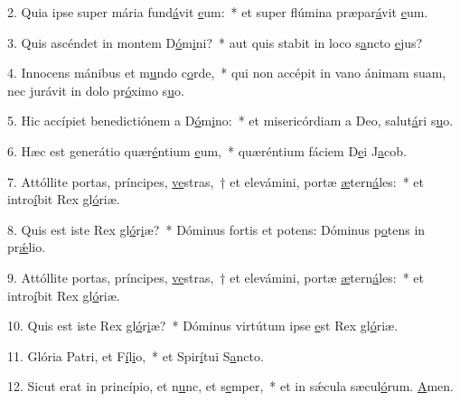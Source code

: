 2. Quia ipse super mária fund\uline{á}vit \uline{e}um:~* et super flúmina præpar\uline{á}vit \uline{e}um.\par 
3. Quis ascéndet in montem D\uline{ó}m\uline{i}ni?~* aut quis stabit in loco s\uline{a}ncto \uline{e}jus?\par 
4. Innocens mánibus et m\uline{u}ndo c\uline{o}rde,~* qui non accépit in vano ánimam suam, nec jurávit in dolo pr\uline{ó}ximo s\uline{u}o.\par 
5. Hic accípiet benedictiónem a D\uline{ó}m\uline{i}no:~* et misericórdiam a Deo, salut\uline{á}ri s\uline{u}o.\par 
6. Hæc est generátio quær\uline{é}ntium \uline{e}um,~* quæréntium fáciem D\uline{e}i J\uline{a}cob.\par 
7. Attóllite portas, príncipes, \uline{ve}stras,~† et elevámini, portæ \uline{æ}tern\uline{á}les:~* et intro\uline{í}bit Rex gl\uline{ó}riæ.\par 
8. Quis est iste Rex gl\uline{ó}r\uline{i}æ?~* Dóminus fortis et potens: Dóminus p\uline{o}tens in pr\uline{ǽ}lio.\par 
9. Attóllite portas, príncipes, \uline{ve}stras,~† et elevámini, portæ \uline{æ}tern\uline{á}les:~* et intro\uline{í}bit Rex gl\uline{ó}riæ.\par 
10. Quis est iste Rex gl\uline{ó}r\uline{i}æ?~* Dóminus virtútum ipse \uline{e}st Rex gl\uline{ó}riæ.\par 
11. Glória Patri, et F\uline{í}l\uline{i}o,~* et Spir\uline{í}tui S\uline{a}ncto.\par 
12. Sicut erat in princípio, et n\uline{u}nc, et s\uline{e}mper,~* et in sǽcula sæcul\uline{ó}rum. \uline{A}men.\par 
